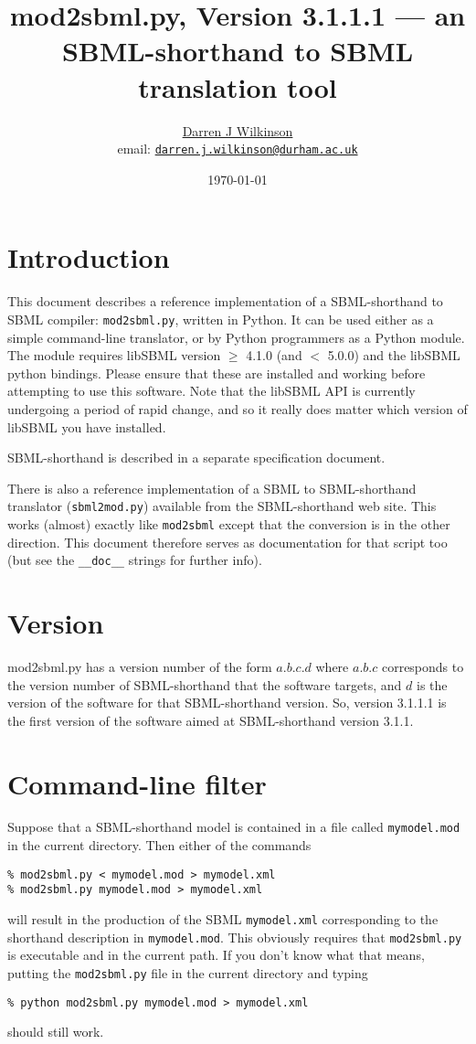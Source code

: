 \documentclass[12pt,a4paper]{article}
\title{mod2sbml.py, Version 3.1.1.1 --- an SBML-shorthand to SBML
translation tool}
\author{\href{https://darrenjw.github.io/}{Darren J
Wilkinson}\\
email: \href{mailto:darren.j.wilkinson@durham.ac.uk}{\texttt{darren.j.wilkinson@durham.ac.uk}}}
\date{\today}
\begin{document}
\sf
\maketitle

\section{Introduction}

This document describes a reference implementation of a SBML-shorthand
to SBML compiler: \verb$mod2sbml.py$, written in Python. It can be
used either as a simple command-line translator, or by Python
programmers as a Python module. The module requires libSBML version
$\geq$ 4.1.0 (and $<$ 5.0.0)
and the libSBML python bindings. Please ensure that these are installed and
working before attempting to use this software. Note that the libSBML
API is currently undergoing a period of rapid change, and so it really
does matter which version of libSBML you have installed.

SBML-shorthand is described in a separate specification document.

There is also a reference implementation of a SBML
to SBML-shorthand translator (\verb$sbml2mod.py$)
available from the
SBML-shorthand web site. This works (almost) exactly like \verb$mod2sbml$
except that the conversion is in the other direction. This document
therefore serves as documentation for that script too (but see the
\verb$__doc__$ strings for further info).

\section{Version}

mod2sbml.py has a version number of the form $a.b.c.d$ where $a.b.c$
corresponds to the version number of SBML-shorthand that the software
targets, and $d$ is the version of the software for that
SBML-shorthand version. So, version 3.1.1.1 is the first version of
the software aimed at SBML-shorthand version 3.1.1.

\section{Command-line filter}

Suppose that a SBML-shorthand model is contained in a file called
\verb$mymodel.mod$ in the current directory. Then either of the commands
\begin{verbatim}
% mod2sbml.py < mymodel.mod > mymodel.xml
% mod2sbml.py mymodel.mod > mymodel.xml
\end{verbatim}
will result in the production of the SBML \verb$mymodel.xml$
corresponding to the shorthand description in \verb$mymodel.mod$. This
obviously requires that \verb$mod2sbml.py$ is executable and in the
current path. If you don't know what that means, putting the
\verb$mod2sbml.py$ file in the current directory and typing
\begin{verbatim}
% python mod2sbml.py mymodel.mod > mymodel.xml
\end{verbatim}
should still work.
\end{document}
